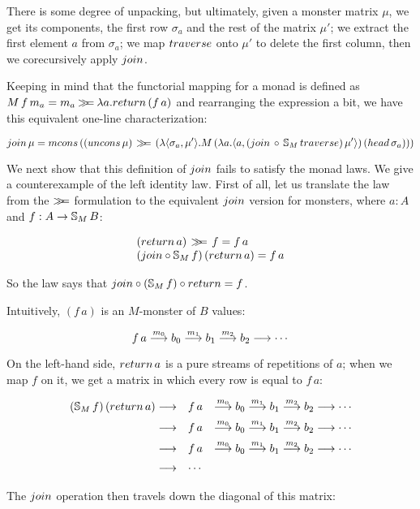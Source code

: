 There is some degree of unpacking, but ultimately, given a monster matrix $\mu$, we get its components, the first row $\sigma_a$ and the rest of the matrix $\mu'$; 
we extract the first element $a$ from $\sigma_a$;
we map $\traverse$ onto $\mu'$ to delete the first column, then we corecursively apply $\join$.

Keeping in mind that the functorial mapping for a monad is defined as $M\,f\,m_a = m_a \bind \lambda a. \return\,(f\,a)$ and rearranging the expression a bit, we have this equivalent one-line characterization:

$$
\join\, \mu = \mcons\, ((\uncons\, \mu) \, \bind \,(\lambda \pair{\sigma_a}{\mu'} . M\,(\lambda a . \pair{a}{(\join\, \comp\, \stream{M}\,\traverse)\, \mu'})\, (\head\, \sigma_a)))
$$

We next show that this definition of $\join$ fails to satisfy the monad laws.
We give a counterexample of the left identity law.
First of all, let us translate the law from the $\mathbin{\gg\!\!=}$ formulation to the equivalent $\join$ version for monsters, where $a:A$ and $f:A\rightarrow \mathbb{S}_{M}\,B$:

$$
\begin{array}{l}
(\return\, a)\, \bind \, f = f\, a\\
(\join \comp \stream{M}\,f)\,(\return\,a) = f\,a
\end{array}
$$

So the law says that $\join \comp (\stream{M}\,f)\comp \return = f$.

Intuitively, $(f\,a)$ is an $M$-monster of $B$ values:

$$
f\,a \stackrel{m_0}{\longrightarrow} b_0 \stackrel{m_1}{\longrightarrow} b_1 \stackrel{m_2}{\longrightarrow} b_2 \stackrel{}{\longrightarrow}\cdots
$$

On the left-hand side, $\return\,a$ is a pure streams of repetitions of $a$; when we map $f$ on it, we get a matrix in which every row is equal to $f\,a$:

$$
\begin{array}[t]{rll}
(\stream{M}\,f)\,(\return\,a) \larrow{} 
 & f\,a 
 & \larrow{m_0} b_0 \larrow{m_1} b_1 \larrow{m_2} b_2 \larrow{}\cdots\\[5pt]
\larrow{} 
 & f\,a 
 & \larrow{m_0} b_0 \larrow{m_1} b_1 \larrow{m_2} b_2 \larrow{}\cdots\\[5pt]
\larrow{} 
 & f\,a 
 & \larrow{m_0} b_0 \larrow{m_1} b_1 \larrow{m_2} b_2 \larrow{}\cdots\\[5pt]
\larrow{} & \cdots
\end{array}
$$

The $\join$ operation then travels down the diagonal of this matrix:

